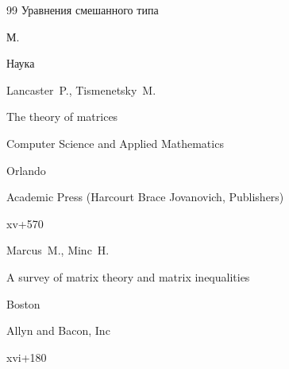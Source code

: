 \begin{thebibliography}{99}
\book Уравнения смешанного типа

\publaddr М.

\publ Наука












\by Lancaster~P., Tismenetsky~M.

\book The theory of matrices

\serial Computer Science and Applied Mathematics

\publaddr Orlando 

\publ Academic Press (Harcourt Brace Jovanovich, Publishers)

\totalpages xv+570 










\by Marcus~M., Minc~H.

\book A survey of matrix theory and matrix inequalities

\publaddr Boston

\publ Allyn and Bacon, Inc

\totalpages xvi+180 
















\end{thebibliography}



\renewcommand{\baselinestretch}{0.85}



\RuDate



\newpage





\makeentitle









